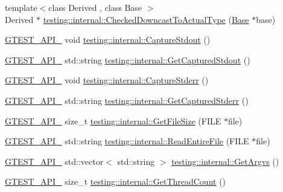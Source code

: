 \begin{DoxyCompactItemize}
\item 
{\footnotesize template$<$class Derived , class Base $>$ }\\Derived $\ast$ \mbox{\hyperlink{namespacetesting_1_1internal_abfe9bfb020d38aa4e0e12c001911b22b}{testing\+::internal\+::\+Checked\+Downcast\+To\+Actual\+Type}} (\mbox{\hyperlink{classBase}{Base}} $\ast$base)
\item 
\mbox{\hyperlink{gtest-port_8h_aa73be6f0ba4a7456180a94904ce17790}{G\+T\+E\+S\+T\+\_\+\+A\+P\+I\+\_\+}} void \mbox{\hyperlink{namespacetesting_1_1internal_acba06d4f0343dec407738ba5544af990}{testing\+::internal\+::\+Capture\+Stdout}} ()
\item 
\mbox{\hyperlink{gtest-port_8h_aa73be6f0ba4a7456180a94904ce17790}{G\+T\+E\+S\+T\+\_\+\+A\+P\+I\+\_\+}} std\+::string \mbox{\hyperlink{namespacetesting_1_1internal_aed657219a9856a8d249a3230de0c54ce}{testing\+::internal\+::\+Get\+Captured\+Stdout}} ()
\item 
\mbox{\hyperlink{gtest-port_8h_aa73be6f0ba4a7456180a94904ce17790}{G\+T\+E\+S\+T\+\_\+\+A\+P\+I\+\_\+}} void \mbox{\hyperlink{namespacetesting_1_1internal_a8ec00d458d0d442bd64af7b5f9c22dda}{testing\+::internal\+::\+Capture\+Stderr}} ()
\item 
\mbox{\hyperlink{gtest-port_8h_aa73be6f0ba4a7456180a94904ce17790}{G\+T\+E\+S\+T\+\_\+\+A\+P\+I\+\_\+}} std\+::string \mbox{\hyperlink{namespacetesting_1_1internal_a374156401da17704099d0c33fa53adfb}{testing\+::internal\+::\+Get\+Captured\+Stderr}} ()
\item 
\mbox{\hyperlink{gtest-port_8h_aa73be6f0ba4a7456180a94904ce17790}{G\+T\+E\+S\+T\+\_\+\+A\+P\+I\+\_\+}} size\+\_\+t \mbox{\hyperlink{namespacetesting_1_1internal_a06ca3f65f5e85c9ce7299b9e4cd52408}{testing\+::internal\+::\+Get\+File\+Size}} (F\+I\+LE $\ast$file)
\item 
\mbox{\hyperlink{gtest-port_8h_aa73be6f0ba4a7456180a94904ce17790}{G\+T\+E\+S\+T\+\_\+\+A\+P\+I\+\_\+}} std\+::string \mbox{\hyperlink{namespacetesting_1_1internal_a2cc0be60c54a8701423fe5297e1349ee}{testing\+::internal\+::\+Read\+Entire\+File}} (F\+I\+LE $\ast$file)
\item 
\mbox{\hyperlink{gtest-port_8h_aa73be6f0ba4a7456180a94904ce17790}{G\+T\+E\+S\+T\+\_\+\+A\+P\+I\+\_\+}} std\+::vector$<$ std\+::string $>$ \mbox{\hyperlink{namespacetesting_1_1internal_a9608256c67f889006be44912e57e3d4f}{testing\+::internal\+::\+Get\+Argvs}} ()
\item 
\mbox{\hyperlink{gtest-port_8h_aa73be6f0ba4a7456180a94904ce17790}{G\+T\+E\+S\+T\+\_\+\+A\+P\+I\+\_\+}} size\+\_\+t \mbox{\hyperlink{namespacetesting_1_1internal_a3b9b3649cd04558bf46c75de52a7ef34}{testing\+::internal\+::\+Get\+Thread\+Count}} ()

\end{DoxyCompactItemize}
